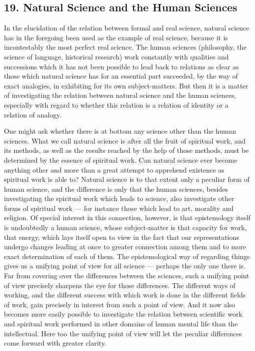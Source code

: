 \documentclass[12pt]{book}
\newcommand{\opage}[1]{\marginnote{\footnotesize\textit{[#1]}}}
\begin{document}
\subsection*{19. Natural Science and the Human Sciences}

In the elucidation of the relation between formal and real science, natural
science has in the foregoing been used as the example of real science, because it
is incontestably the most perfect real science. The human sciences (philosophy,
the science of language, historical research) work constantly with qualities and
successions which it has not been possible to lead back to relations as clear as
those which natural science has for an essential part succeeded, by the way of
exact analogies, in exhibiting for its own subject-matters. But then it is a
matter of investigating the relation between natural science and the human
sciences, especially with regard to whether this relation is a relation of
identity or a relation of analogy.

One might ask whether there is at bottom any science other than the human
sciences. What we call natural science is after all the fruit of spiritual work,
and its methods, as well as the results reached by the help of those methods,
must be determined by the essence of spiritual work. Can natural science ever
become anything other and more than a great attempt to apprehend existence as
spiritual work is able to? Natural science is to that extent only a peculiar form
of human science, and the difference is only that the human sciences, besides
investigating the spiritual work which leads to science, also investigate other
forms of spiritual work --- for instance those which lead to art, morality and
religion. Of special interest in this connection, however, is that epistemology
itself is undoubtedly a human science, whose subject-matter is that capacity for
work, that energy, \opage{110}which lays itself open to view in the fact that our
representations undergo changes leading at once to greater connection among them
and to more exact determination of each of them. The epistemological way of
regarding things gives us a unifying point of view for all science --- perhaps
the only one there is. Far from covering over the differences between the
sciences, such a unifying point of view precisely sharpens the eye for those
differences. The different ways of working, and the different success with which
work is done in the different fields of work, gain precisely in interest from
such a point of view. And it now also becomes more easily possible to investigate
the relation between scientific work and spiritual work performed in other
domains of human mental life than the intellectual. Here too the unifying point
of view will let the peculiar differences come forward with greater clarity.
\end{document}
